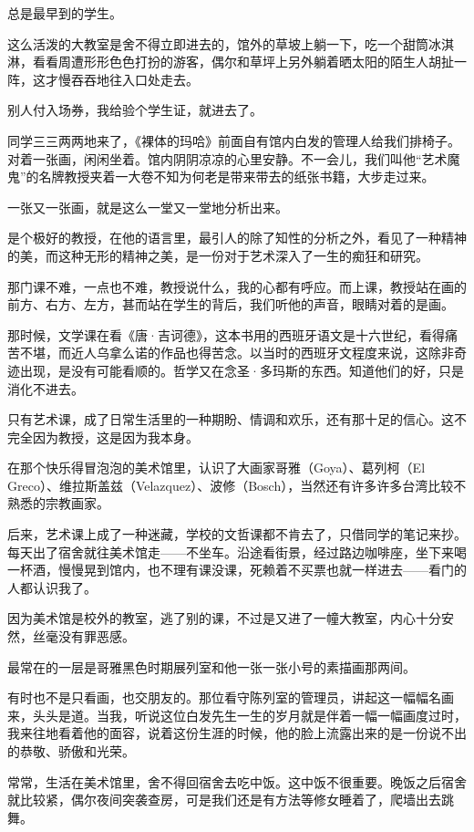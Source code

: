 \par 总是最早到的学生。
\par 这么活泼的大教室是舍不得立即进去的，馆外的草坡上躺一下，吃一个甜筒冰淇淋，看看周遭形形色色打扮的游客，偶尔和草坪上另外躺着晒太阳的陌生人胡扯一阵，这才慢吞吞地往入口处走去。
\par 别人付入场券，我给验个学生证，就进去了。
\par 同学三三两两地来了，《裸体的玛哈》前面自有馆内白发的管理人给我们排椅子。对着一张画，闲闲坐着。馆内阴阴凉凉的心里安静。不一会儿，我们叫他“艺术魔鬼”的名牌教授夹着一大卷不知为何老是带来带去的纸张书籍，大步走过来。
\par 一张又一张画，就是这么一堂又一堂地分析出来。
\par 是个极好的教授，在他的语言里，最引人的除了知性的分析之外，看见了一种精神的美，而这种无形的精神之美，是一份对于艺术深入了一生的痴狂和研究。
\par 那门课不难，一点也不难，教授说什么，我的心都有呼应。而上课，教授站在画的前方、右方、左方，甚而站在学生的背后，我们听他的声音，眼睛对着的是画。
\par 那时候，文学课在看《唐·吉诃德》，这本书用的西班牙语文是十六世纪，看得痛苦不堪，而近人乌拿么诺的作品也得苦念。以当时的西班牙文程度来说，这除非奇迹出现，是没有可能看顺的。哲学又在念圣·多玛斯的东西。知道他们的好，只是消化不进去。
\par 只有艺术课，成了日常生活里的一种期盼、情调和欢乐，还有那十足的信心。这不完全因为教授，这是因为我本身。
\par 在那个快乐得冒泡泡的美术馆里，认识了大画家哥雅（Goya）、葛列柯（El Greco）、维拉斯盖兹（Velazquez）、波修（Bosch），当然还有许多许多台湾比较不熟悉的宗教画家。
\par 后来，艺术课上成了一种迷藏，学校的文哲课都不肯去了，只借同学的笔记来抄。每天出了宿舍就往美术馆走——不坐车。沿途看街景，经过路边咖啡座，坐下来喝一杯酒，慢慢晃到馆内，也不理有课没课，死赖着不买票也就一样进去——看门的人都认识我了。
\par 因为美术馆是校外的教室，逃了别的课，不过是又进了一幢大教室，内心十分安然，丝毫没有罪恶感。
\par 最常在的一层是哥雅黑色时期展列室和他一张一张小号的素描画那两间。
\par 有时也不是只看画，也交朋友的。那位看守陈列室的管理员，讲起这一幅幅名画来，头头是道。当我，听说这位白发先生一生的岁月就是伴着一幅一幅画度过时，我来往地看着他的面容，说着这份生涯的时候，他的脸上流露出来的是一份说不出的恭敬、骄傲和光荣。
\par 常常，生活在美术馆里，舍不得回宿舍去吃中饭。这中饭不很重要。晚饭之后宿舍就比较紧，偶尔夜间突袭查房，可是我们还是有方法等修女睡着了，爬墙出去跳舞。
